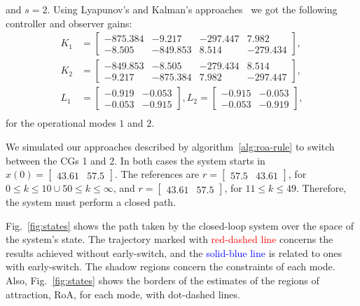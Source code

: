 %
and \(s=2\). Using Lyapunov's and Kalman's
approaches~\parencite{chen:linear,hespanha:linear} we got the following
controller and observer gains:
%
\begin{align*}
	K_1 & = \begin{bmatrix}
		-875.384 & -9.217   & -297.447 & 7.982    \\
		-8.505   & -849.853 & 8.514    & -279.434
	\end{bmatrix}, \\
	K_2 & = \begin{bmatrix}
		-849.853 & -8.505   & -279.434 & 8.514    \\
		-9.217   & -875.384 & 7.982    & -297.447
	\end{bmatrix}, \\
	L_1 & = \begin{bmatrix}
		-0.919 & -0.053 \\
		-0.053 & -0.915
	\end{bmatrix},
	L_2 = \begin{bmatrix}
		-0.915 & -0.053 \\
		-0.053 & -0.919
	\end{bmatrix},   \\
\end{align*}
%
for the operational modes \(1\) and \(2\).

We simulated our approaches described by algorithm~\ref{alg:roa-rule} to switch
between the CGs 1 and 2. In both cases the system starts in \(x(0) =
\begin{bmatrix}43.61 & 57.5\end{bmatrix}\). The references are \(r =
\begin{bmatrix}57.5 & 43.61\end{bmatrix}\), for \(0\leq k\leq 10 \cup 50 \leq k
\leq\infty{}\), and \(r = \begin{bmatrix}43.61& 57.5\end{bmatrix}\), for \(11
\leq k \leq 49\). Therefore, the system must perform a closed path.

Fig.~\ref{fig:states} shows the path taken by the closed-loop system over the
space of the system's state. The trajectory marked with
\textcolor{red}{red-dashed line} concerns the results achieved without
early-switch, and the \textcolor{blue}{solid-blue line} is related to ones with
early-switch. The shadow regions concern the constraints of each mode. Also,
Fig.~\ref{fig:states} shows the borders of the estimates of the regions of
attraction, RoA, for each mode, with dot-dashed lines.

